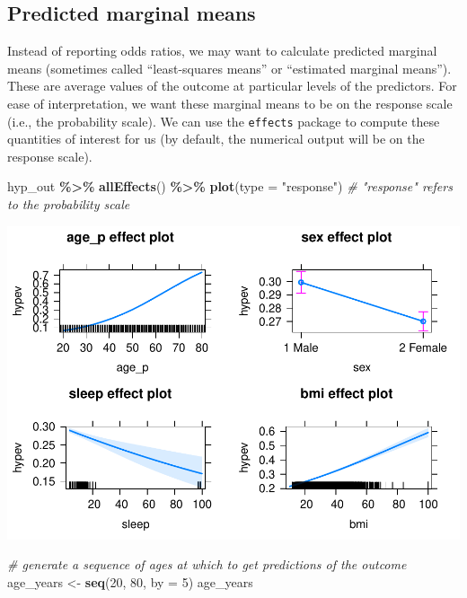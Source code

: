 \documentclass[
]{book}
\newenvironment{Shaded}{\begin{snugshade}}{\end{snugshade}}
\newcommand{\CommentTok}[1]{\textcolor[rgb]{0.56,0.35,0.01}{\textit{#1}}}
\newcommand{\DataTypeTok}[1]{\textcolor[rgb]{0.13,0.29,0.53}{#1}}
\newcommand{\DecValTok}[1]{\textcolor[rgb]{0.00,0.00,0.81}{#1}}
\newcommand{\KeywordTok}[1]{\textcolor[rgb]{0.13,0.29,0.53}{\textbf{#1}}}
\newcommand{\NormalTok}[1]{#1}
\newcommand{\OperatorTok}[1]{\textcolor[rgb]{0.81,0.36,0.00}{\textbf{#1}}}
\newcommand{\StringTok}[1]{\textcolor[rgb]{0.31,0.60,0.02}{#1}}
\begin{document}
\hypertarget{predicted-marginal-means}{%
\subsection{Predicted marginal means}\label{predicted-marginal-means}}

Instead of reporting odds ratios, we may want to calculate predicted marginal means (sometimes called ``least-squares means'' or ``estimated marginal means''). These are average values of the outcome at particular levels of the predictors. For ease of interpretation, we want these marginal means to be on the response scale (i.e., the probability scale). We can use the \texttt{effects} package to compute these quantities of interest for us (by default, the numerical output will be on the response scale).

\begin{Shaded}
\begin{Highlighting}[]
\NormalTok{  hyp\_out }\OperatorTok{\%\textgreater{}\%}\StringTok{ }
\StringTok{      }\KeywordTok{allEffects}\NormalTok{() }\OperatorTok{\%\textgreater{}\%}
\StringTok{      }\KeywordTok{plot}\NormalTok{(}\DataTypeTok{type =} \StringTok{"response"}\NormalTok{) }\CommentTok{\# "response" refers to the probability scale}
\end{Highlighting}
\end{Shaded}

\includegraphics{R/Rmodels/figures/unnamed-chunk-117-1.pdf}

\begin{Shaded}
\begin{Highlighting}[]
  \CommentTok{\# generate a sequence of ages at which to get predictions of the outcome}
\NormalTok{  age\_years \textless{}{-}}\StringTok{ }\KeywordTok{seq}\NormalTok{(}\DecValTok{20}\NormalTok{, }\DecValTok{80}\NormalTok{, }\DataTypeTok{by =} \DecValTok{5}\NormalTok{)}
\NormalTok{  age\_years}
\end{Highlighting}
\end{Shaded}
\end{document}
